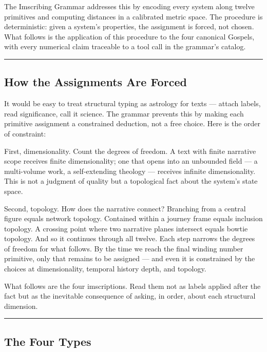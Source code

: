 \documentclass[12pt,a4paper]{article}
\begin{document}
The Imscribing Grammar addresses this by encoding every system along twelve primitives and computing distances in a calibrated metric space. The procedure is deterministic: given a system's properties, the assignment is forced, not chosen. What follows is the application of this procedure to the four canonical Gospels, with every numerical claim traceable to a tool call in the grammar's catalog.

\begin{center}
\rule{0.5\textwidth}{0.4pt}
\end{center}

\subsection{How the Assignments Are Forced}

It would be easy to treat structural typing as astrology for texts --- attach labels, read significance, call it science. The grammar prevents this by making each primitive assignment a constrained deduction, not a free choice. Here is the order of constraint:

First, dimensionality. Count the degrees of freedom. A text with finite narrative scope receives finite dimensionality; one that opens into an unbounded field --- a multi-volume work, a self-extending theology --- receives infinite dimensionality. This is not a judgment of quality but a topological fact about the system's state space.

Second, topology. How does the narrative connect? Branching from a central figure equals network topology. Contained within a journey frame equals inclusion topology. A crossing point where two narrative planes intersect equals bowtie topology. And so it continues through all twelve. Each step narrows the degrees of freedom for what follows. By the time we reach the final winding number primitive, only that remains to be assigned --- and even it is constrained by the choices at dimensionality, temporal history depth, and topology.

What follows are the four imscriptions. Read them not as labels applied after the fact but as the inevitable consequence of asking, in order, about each structural dimension.

\begin{center}
\rule{0.5\textwidth}{0.4pt}
\end{center}

\subsection{The Four Types}
\end{document}
